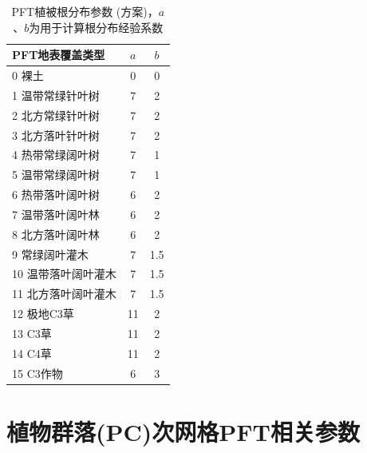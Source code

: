 \begin{table}[htbp]
\centering
\caption[PFT植被根分布参数 (\citet{zeng2001global}方案)]{PFT植被根分布参数 (\citet{zeng2001global}方案)，$a$、$b$为用于计算根分布经验系数}
\label{tab:PFT植被根分布参数}
\begin{tabular}{@{}lcc@{}}
\toprule
PFT地表覆盖类型     & $a$ & $b$ \\ \midrule
 0 裸土        & 0  & 0   \\
 1 温带常绿针叶树   & 7  & 2   \\
 2 北方常绿针叶树   & 7  & 2   \\
 3 北方落叶针叶树   & 7  & 2   \\
 4 热带常绿阔叶树   & 7  & 1   \\
 5 温带常绿阔叶树   & 7  & 1   \\
 6 热带落叶阔叶树   & 6  & 2   \\
 7 温带落叶阔叶林   & 6  & 2   \\
 8 北方落叶阔叶林   & 6  & 2   \\
 9 常绿阔叶灌木    & 7  & 1.5 \\
10 温带落叶阔叶灌木 & 7  & 1.5 \\
11 北方落叶阔叶灌木 & 7  & 1.5 \\
12 极地C3草    & 11 & 2   \\
13 C3草      & 11 & 2   \\
14 C4草      & 11 & 2   \\
15 C3作物     & 6  & 3  \\ \bottomrule
\end{tabular}
\end{table}


\chapter{植物群落(PC)次网格PFT相关参数}\label{植物群落PC次网格PFT相关参数}

